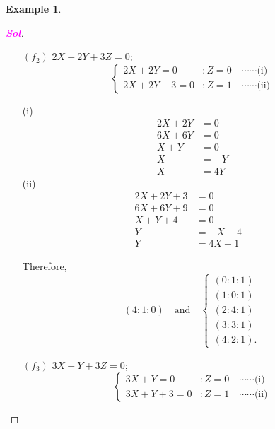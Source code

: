 \documentclass[12pt,openany]{book}
\theoremstyle{definition}
\newtheorem{example}{Example}[chapter]
\newcommand{\sol}{\textcolor{magenta}{\bf Sol}}
\begin{document}
\begin{example}
\begin{proof}[\sol]
\begin{enumerate}
\begin{multicols}{2}
\begin{align*}
						X+4Y+3&=0\\
						X-Y+3&=0\\
						Y&=X+3
					\end{align*}
				\end{multicols} Therefore, \[
				(1:1:0)\quad\text{and}\quad\begin{cases}
					(0:3:1)\\
					(1:4:1)\\
					(2:0:1)\\
					(3:1:1)\\
					(4:2:1).
				\end{cases}
				\]
				\item[$(f_2)$] $2X+2Y+3Z=0$; \[
				\begin{cases}
					2X+2Y=0 &: Z=0\quad\cdots\cdots\text{(i)}\\
					2X+2Y+3=0 &: Z=1\quad\cdots\cdots\text{(ii)}
				\end{cases}
				\] \begin{multicols}{2}
					(i)
					\begin{align*}
						2X+2Y&=0\\
						6X+6Y&=0\\
						X+Y&=0\\
						X&=-Y\\
						X&=4Y
					\end{align*}
					(ii)
					\begin{align*}
						2X+2Y+3&=0\\
						6X+6Y+9&=0\\
						X+Y+4&=0\\
						Y&=-X-4&\\
						Y&=4X+1
					\end{align*}
				\end{multicols} Therefore, \[
				(4:1:0)\quad\text{and}\quad\begin{cases}
					(0:1:1)\\
					(1:0:1)\\
					(2:4:1)\\
					(3:3:1)\\
					(4:2:1).
				\end{cases}
				\]
				\vspace{8pt}
				\item[$(f_3)$] $3X+Y+3Z=0$; \[
				\begin{cases}
					3X+Y=0 &: Z=0\quad\cdots\cdots\text{(i)}\\
					3X+Y+3=0 &: Z=1\quad\cdots\cdots\text{(ii)}

\end{cases}\]
\end{enumerate}
\end{proof}
\end{example}
\end{document}
